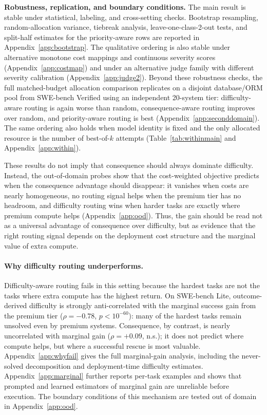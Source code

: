 \documentclass{article}
\begin{document}
\textbf{Robustness, replication, and boundary conditions.}
The main result is stable under statistical, labeling, and
cross-setting checks. Bootstrap resampling, random-allocation variance,
tiebreak analysis, leave-one-class-2-out tests, and split-half
estimates for the priority-aware rows are reported in
Appendix~\ref{app:bootstrap}. The qualitative ordering is also stable
under alternative monotone cost mappings and continuous severity scores
(Appendix~\ref{app:costmap}) and under an alternative judge family with
different severity calibration (Appendix~\ref{app:judge2}). Beyond
these robustness checks, the full matched-budget allocation comparison
replicates on a disjoint database/ORM pool from SWE-bench Verified
using an independent 20-system tier: difficulty-aware routing is again
worse than random, consequence-aware routing improves over random, and
priority-aware routing is best (Appendix~\ref{app:seconddomain}).
The same ordering also holds when model identity is fixed and the only
allocated resource is the number of best-of-$k$ attempts
(Table~\ref{tab:withinmain} and Appendix~\ref{app:within}).

These results do not imply that consequence should always dominate
difficulty. Instead, the out-of-domain probes show that the
cost-weighted objective predicts when the consequence advantage should
disappear: it vanishes when costs are nearly homogeneous, no routing
signal helps when the premium tier has no headroom, and difficulty
routing wins when harder tasks are exactly where premium compute helps
(Appendix~\ref{app:ood}). Thus, the gain should be read not as a
universal advantage of consequence over difficulty, but as evidence
that the right routing signal depends on the deployment cost structure
and the marginal value of extra compute.




\paragraph{Why difficulty routing underperforms.}
Difficulty-aware routing fails in this setting because the hardest
tasks are not the tasks where extra compute has the highest return.
On SWE-bench Lite, outcome-derived difficulty is strongly
anti-correlated with the marginal success gain from the premium tier
($\rho=-0.78$, $p<10^{-60}$): many of the hardest tasks remain
unsolved even by premium systems. Consequence, by contrast, is nearly
uncorrelated with marginal gain ($\rho=+0.09$, n.s.); it does not
predict where compute helps, but where a successful rescue is most
valuable. Appendix~\ref{app:whyfail} gives the full marginal-gain
analysis, including the never-solved decomposition and deployment-time
difficulty estimates. Appendix~\ref{app:marginal} further reports
per-task examples and shows that prompted and learned estimators of
marginal gain are unreliable before execution. The boundary conditions
of this mechanism are tested out of domain in Appendix~\ref{app:ood}.
\end{document}
